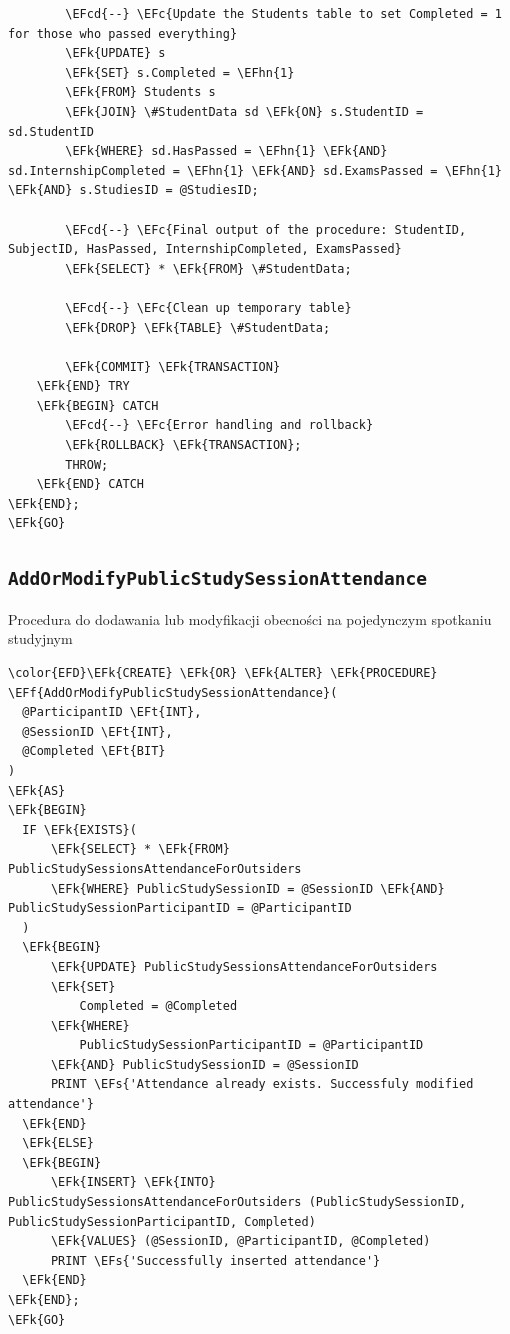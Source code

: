 \documentclass[11pt]{article}
\newcommand{\EFc}[1]{\textcolor{EFc}{\textit{#1}}} %
\newcommand{\EFcd}[1]{\textcolor{EFcd}{\textit{#1}}} %
\newcommand{\EFs}[1]{\textcolor{EFs}{#1}} %
\newcommand{\EFk}[1]{\textcolor{EFk}{\textbf{#1}}} %
\newcommand{\EFf}[1]{\textcolor{EFf}{#1}} %
\newcommand{\EFt}[1]{\textcolor{EFt}{\textbf{#1}}} %
\newcommand{\EFhn}[1]{\textcolor{EFhn}{#1}} %
\begin{document}
\begin{Code}
\begin{Verbatim}
        \EFcd{--} \EFc{Update the Students table to set Completed = 1 for those who passed everything}
        \EFk{UPDATE} s
        \EFk{SET} s.Completed = \EFhn{1}
        \EFk{FROM} Students s
        \EFk{JOIN} \#StudentData sd \EFk{ON} s.StudentID = sd.StudentID
        \EFk{WHERE} sd.HasPassed = \EFhn{1} \EFk{AND} sd.InternshipCompleted = \EFhn{1} \EFk{AND} sd.ExamsPassed = \EFhn{1} \EFk{AND} s.StudiesID = @StudiesID;

        \EFcd{--} \EFc{Final output of the procedure: StudentID, SubjectID, HasPassed, InternshipCompleted, ExamsPassed}
        \EFk{SELECT} * \EFk{FROM} \#StudentData;

        \EFcd{--} \EFc{Clean up temporary table}
        \EFk{DROP} \EFk{TABLE} \#StudentData;

        \EFk{COMMIT} \EFk{TRANSACTION}
    \EFk{END} TRY
    \EFk{BEGIN} CATCH
        \EFcd{--} \EFc{Error handling and rollback}
        \EFk{ROLLBACK} \EFk{TRANSACTION};
        THROW;
    \EFk{END} CATCH
\EFk{END};
\EFk{GO}
\end{Verbatim}
\end{Code}
\subsection{\texttt{AddOrModifyPublicStudySessionAttendance}}
\label{sec:org91125bf}
Procedura do dodawania lub modyfikacji obecności na pojedynczym spotkaniu studyjnym
\begin{Code}
\begin{Verbatim}
\color{EFD}\EFk{CREATE} \EFk{OR} \EFk{ALTER} \EFk{PROCEDURE} \EFf{AddOrModifyPublicStudySessionAttendance}(
  @ParticipantID \EFt{INT},
  @SessionID \EFt{INT},
  @Completed \EFt{BIT}
)
\EFk{AS}
\EFk{BEGIN}
  IF \EFk{EXISTS}(
      \EFk{SELECT} * \EFk{FROM} PublicStudySessionsAttendanceForOutsiders
      \EFk{WHERE} PublicStudySessionID = @SessionID \EFk{AND} PublicStudySessionParticipantID = @ParticipantID
  )
  \EFk{BEGIN}
      \EFk{UPDATE} PublicStudySessionsAttendanceForOutsiders
      \EFk{SET}
          Completed = @Completed
      \EFk{WHERE}
          PublicStudySessionParticipantID = @ParticipantID
      \EFk{AND} PublicStudySessionID = @SessionID
      PRINT \EFs{'Attendance already exists. Successfuly modified attendance'}
  \EFk{END}
  \EFk{ELSE}
  \EFk{BEGIN}
      \EFk{INSERT} \EFk{INTO} PublicStudySessionsAttendanceForOutsiders (PublicStudySessionID, PublicStudySessionParticipantID, Completed)
      \EFk{VALUES} (@SessionID, @ParticipantID, @Completed)
      PRINT \EFs{'Successfully inserted attendance'}
  \EFk{END}
\EFk{END};
\EFk{GO}
\end{Verbatim}
\end{Code}
\end{document}
